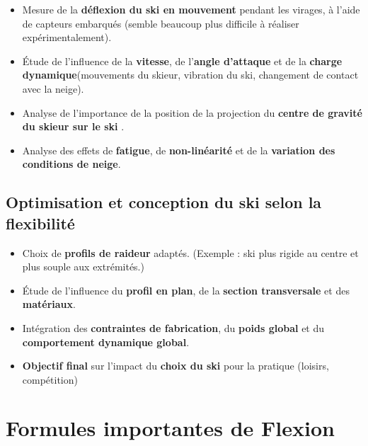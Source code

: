 \documentclass[12pt, a4paper]{article}
\begin{document}
\begin{itemize}
  \item Mesure de la \textbf{déflexion du ski en mouvement} pendant les virages, à l’aide de capteurs embarqués (semble beaucoup plus difficile à réaliser expérimentalement).
  \item Étude de l’influence de la \textbf{vitesse}, de l’\textbf{angle d’attaque} et de la \textbf{charge dynamique}(mouvements du skieur, vibration du ski, changement de contact avec la neige).
  \item Analyse de l'importance de la position de la projection du \textbf{centre de gravité du skieur sur le ski} .
  \item Analyse des effets de \textbf{fatigue}, de \textbf{non-linéarité} et de la \textbf{variation des conditions de neige}.
\end{itemize}

\subsection{Optimisation et conception du ski selon la flexibilité}

\begin{itemize}
  \item Choix de \textbf{profils de raideur} adaptés. (Exemple : ski plus rigide au centre et plus souple aux extrémités.)
  \item Étude de l’influence du \textbf{profil en plan}, de la \textbf{section transversale} et des \textbf{matériaux}.
  \item Intégration des \textbf{contraintes de fabrication}, du \textbf{poids global} et du \textbf{comportement dynamique global}.
  \item \textbf{Objectif final} sur l'impact du \textbf{choix du ski }pour la pratique (loisirs, compétition)
\end{itemize}

\section{\textbf{Formules importantes de Flexion}}
\end{document}
